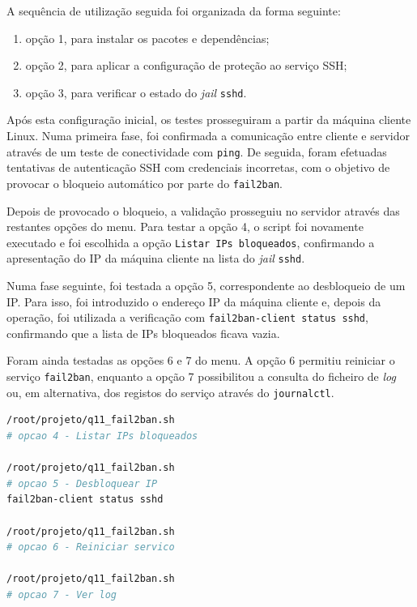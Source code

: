 A sequ\^encia de utiliza\c{c}\~ao seguida foi organizada da forma seguinte:

\begin{enumerate}
    \item op\c{c}\~ao 1, para instalar os pacotes e depend\^encias;
    \item op\c{c}\~ao 2, para aplicar a configura\c{c}\~ao de prote\c{c}\~ao ao servi\c{c}o SSH;
    \item op\c{c}\~ao 3, para verificar o estado do \textit{jail} \texttt{sshd}.
\end{enumerate}

Ap\'os esta configura\c{c}\~ao inicial, os testes prosseguiram a partir da m\'aquina cliente Linux. Numa primeira fase, foi confirmada a comunica\c{c}\~ao entre cliente e servidor atrav\'es de um teste de conectividade com \texttt{ping}. De seguida, foram efetuadas tentativas de autentica\c{c}\~ao SSH com credenciais incorretas, com o objetivo de provocar o bloqueio autom\'atico por parte do \texttt{fail2ban}.

Depois de provocado o bloqueio, a valida\c{c}\~ao prosseguiu no servidor atrav\'es das restantes op\c{c}\~oes do menu. Para testar a op\c{c}\~ao 4, o script foi novamente executado e foi escolhida a op\c{c}\~ao \texttt{Listar IPs bloqueados}, confirmando a apresenta\c{c}\~ao do IP da m\'aquina cliente na lista do \textit{jail} \texttt{sshd}.

Numa fase seguinte, foi testada a op\c{c}\~ao 5, correspondente ao desbloqueio de um IP. Para isso, foi introduzido o endere\c{c}o IP da m\'aquina cliente e, depois da opera\c{c}\~ao, foi utilizada a verifica\c{c}\~ao com \texttt{fail2ban-client status sshd}, confirmando que a lista de IPs bloqueados ficava vazia.

Foram ainda testadas as op\c{c}\~oes 6 e 7 do menu. A op\c{c}\~ao 6 permitiu reiniciar o servi\c{c}o \texttt{fail2ban}, enquanto a op\c{c}\~ao 7 possibilitou a consulta do ficheiro de \textit{log} ou, em alternativa, dos registos do servi\c{c}o atrav\'es do \texttt{journalctl}.

\begin{lstlisting}[language=bash,caption={Validacoes adicionais do menu do Fail2Ban}]
/root/projeto/q11_fail2ban.sh
# opcao 4 - Listar IPs bloqueados

/root/projeto/q11_fail2ban.sh
# opcao 5 - Desbloquear IP
fail2ban-client status sshd

/root/projeto/q11_fail2ban.sh
# opcao 6 - Reiniciar servico

/root/projeto/q11_fail2ban.sh
# opcao 7 - Ver log
\end{lstlisting}

